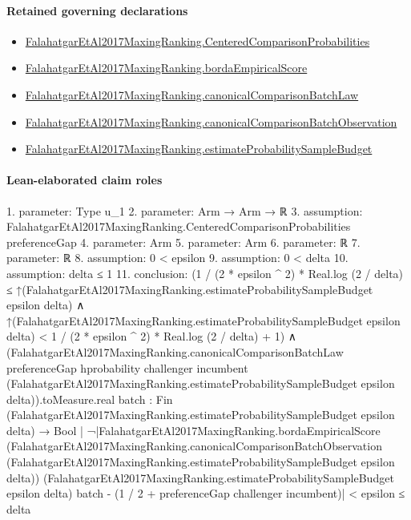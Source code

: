 \documentclass[10pt]{article}
\begin{document}
\paragraph{Retained governing declarations}
\begin{itemize}\raggedright
\item \hyperlink{paper-prerequisite-b99b697ef57f53ce}{Falahatgar\allowbreak{}Et\allowbreak{}Al2017\allowbreak{}Maxing\allowbreak{}Ranking.\allowbreak{}Centered\allowbreak{}Comparison\allowbreak{}Probabilities}
\item \hyperlink{paper-prerequisite-2a72291ebc16ccb3}{Falahatgar\allowbreak{}Et\allowbreak{}Al2017\allowbreak{}Maxing\allowbreak{}Ranking.\allowbreak{}borda\allowbreak{}Empirical\allowbreak{}Score}
\item \hyperlink{governing-declaration-4022b877e3daa15e}{Falahatgar\allowbreak{}Et\allowbreak{}Al2017\allowbreak{}Maxing\allowbreak{}Ranking.\allowbreak{}canonical\allowbreak{}Comparison\allowbreak{}Batch\allowbreak{}Law}
\item \hyperlink{governing-declaration-1ffc62264cfecf06}{Falahatgar\allowbreak{}Et\allowbreak{}Al2017\allowbreak{}Maxing\allowbreak{}Ranking.\allowbreak{}canonical\allowbreak{}Comparison\allowbreak{}Batch\allowbreak{}Observation}
\item \hyperlink{paper-prerequisite-0a381f4fdb14ac40}{Falahatgar\allowbreak{}Et\allowbreak{}Al2017\allowbreak{}Maxing\allowbreak{}Ranking.\allowbreak{}estimate\allowbreak{}Probability\allowbreak{}Sample\allowbreak{}Budget}
\end{itemize}
\paragraph{Lean-elaborated claim roles}\begin{ReviewVerbatim}
1. parameter: Type u_1
2. parameter: Arm → Arm → ℝ
3. assumption: FalahatgarEtAl2017MaxingRanking.CenteredComparisonProbabilities preferenceGap
4. parameter: Arm
5. parameter: Arm
6. parameter: ℝ
7. parameter: ℝ
8. assumption: 0 < epsilon
9. assumption: 0 < delta
10. assumption: delta ≤ 1
11. conclusion: (1 / (2 * epsilon ^ 2) * Real.log (2 / delta) ≤
      ↑(FalahatgarEtAl2017MaxingRanking.estimateProbabilitySampleBudget epsilon delta) ∧
    ↑(FalahatgarEtAl2017MaxingRanking.estimateProbabilitySampleBudget epsilon delta) <
      1 / (2 * epsilon ^ 2) * Real.log (2 / delta) + 1) ∧
  (FalahatgarEtAl2017MaxingRanking.canonicalComparisonBatchLaw preferenceGap hprobability challenger incumbent
            (FalahatgarEtAl2017MaxingRanking.estimateProbabilitySampleBudget epsilon delta)).toMeasure.real
      {batch : Fin (FalahatgarEtAl2017MaxingRanking.estimateProbabilitySampleBudget epsilon delta) → Bool |
        ¬|FalahatgarEtAl2017MaxingRanking.bordaEmpiricalScore
                  (FalahatgarEtAl2017MaxingRanking.canonicalComparisonBatchObservation
                    (FalahatgarEtAl2017MaxingRanking.estimateProbabilitySampleBudget epsilon delta))
                  (FalahatgarEtAl2017MaxingRanking.estimateProbabilitySampleBudget epsilon delta) batch -
                (1 / 2 + preferenceGap challenger incumbent)| <
            epsilon} ≤
    delta
\end{ReviewVerbatim}
\end{document}
